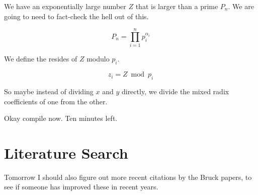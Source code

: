 \documentclass{article}
\begin{document}
We have an exponentially large number $Z$ that is larger than
a prime $P_n$. We are going to need to fact-check the hell out of this.

\begin{equation}
P_n = \prod_{i=1}^n p_i^{\alpha_i}
\end{equation}

We define the resides of $Z$ modulo $p_i$.

\begin{equation}
z_i = Z \bmod p_i
\end{equation}

So maybe instead of dividing $x$ and $y$ directly, we divide the mixed 
radix coefficients of one from the other.

Okay compile now. Ten minutes left.

\section{Literature Search}

Tomorrow I should also figure out more recent citations by the Bruck papers,
to see if someone has improved these in recent years.
\end{document}
